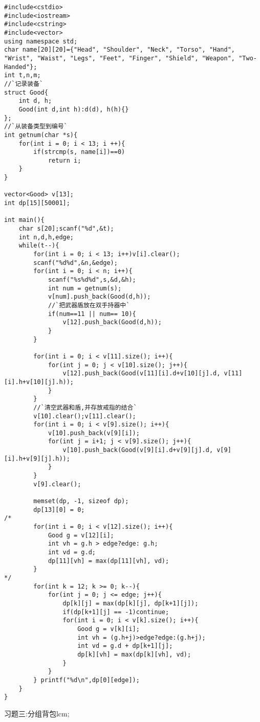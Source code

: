 \begin{lstlisting}
#include<cstdio>
#include<iostream>
#include<cstring>
#include<vector>
using namespace std;
char name[20][20]={"Head", "Shoulder", "Neck", "Torso", "Hand", "Wrist", "Waist", "Legs", "Feet", "Finger", "Shield", "Weapon", "Two-Handed"};
int t,n,m;
//`记录装备`
struct Good{
    int d, h;
    Good(int d,int h):d(d), h(h){}
};
//`从装备类型到编号`
int getnum(char *s){
    for(int i = 0; i < 13; i ++){
        if(strcmp(s, name[i])==0)
            return i;
    }
}

vector<Good> v[13];
int dp[15][50001];

int main(){
    char s[20];scanf("%d",&t);
    int n,d,h,edge;
    while(t--){
        for(int i = 0; i < 13; i++)v[i].clear();
        scanf("%d%d",&n,&edge);
        for(int i = 0; i < n; i++){
            scanf("%s%d%d",s,&d,&h);
            int num = getnum(s);
            v[num].push_back(Good(d,h));
            //`把武器盾放在双手持器中`
            if(num==11 || num== 10){
                v[12].push_back(Good(d,h));
            }
        }

        for(int i = 0; i < v[11].size(); i++){
            for(int j = 0; j < v[10].size(); j++){
                v[12].push_back(Good(v[11][i].d+v[10][j].d, v[11][i].h+v[10][j].h));
            }
        }
        //`清空武器和盾,并存放戒指的结合`
        v[10].clear();v[11].clear();
        for(int i = 0; i < v[9].size(); i++){
            v[10].push_back(v[9][i]);
            for(int j = i+1; j < v[9].size(); j++){
                v[10].push_back(Good(v[9][i].d+v[9][j].d, v[9][i].h+v[9][j].h));
            }
        }
        v[9].clear();

        memset(dp, -1, sizeof dp);
        dp[13][0] = 0;
/*
        for(int i = 0; i < v[12].size(); i++){
            Good g = v[12][i];
            int vh = g.h > edge?edge: g.h;
            int vd = g.d;
            dp[11][vh] = max(dp[11][vh], vd);
        }
*/
        for(int k = 12; k >= 0; k--){
            for(int j = 0; j <= edge; j++){
                dp[k][j] = max(dp[k][j], dp[k+1][j]);
                if(dp[k+1][j] == -1)continue;
                for(int i = 0; i < v[k].size(); i++){
                    Good g = v[k][i];
                    int vh = (g.h+j)>edge?edge:(g.h+j);
                    int vd = g.d + dp[k+1][j];
                    dp[k][vh] = max(dp[k][vh], vd);
                }
            }
        } printf("%d\n",dp[0][edge]);
    }
}
\end{lstlisting}

习题三:分组背包lcm;


